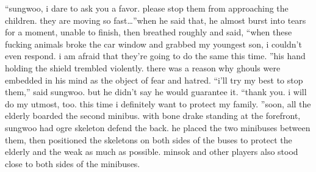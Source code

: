 “sungwoo, i dare to ask you a favor.
 please stop them from approaching the children.
 they are moving so fast…”when he said that, he almost burst into tears for a moment, unable to finish, then breathed roughly and said, “when these fucking animals broke the car window and grabbed my youngest son, i couldn’t even respond.
 i am afraid that they’re going to do the same this time.
”his hand holding the shield trembled violently.
 there was a reason why ghouls were embedded in his mind as the object of fear and hatred.
“i’ll try my best to stop them,” said sungwoo.
 but he didn’t say he would guarantee it.
“thank you.
 i will do my utmost, too.
 this time i definitely want to protect my family.
”soon, all the elderly boarded the second minibus.
with bone drake standing at the forefront, sungwoo had ogre skeleton defend the back.
he placed the two minibuses between them, then positioned the skeletons on both sides of the buses to protect the elderly and the weak as much as possible.
 minsok and other players also stood close to both sides of the minibuses.

